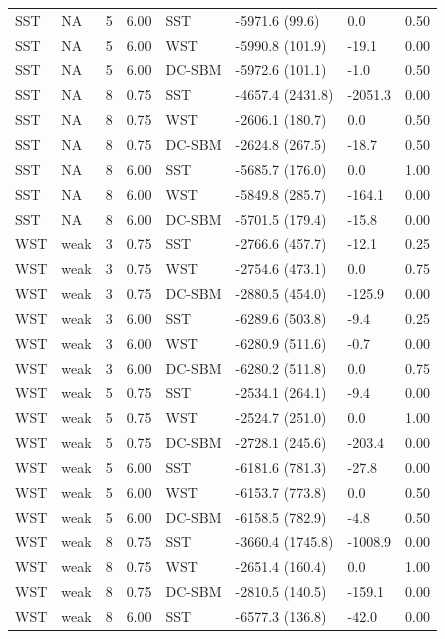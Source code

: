 \begin{table}
\begin{tabular}[t]{llrrllll}
\addlinespace
SST & NA & 5 & 6.00 & SST & -5971.6 (99.6) & 0.0 & 0.50\\
SST & NA & 5 & 6.00 & WST & -5990.8 (101.9) & -19.1 & 0.00\\
SST & NA & 5 & 6.00 & DC-SBM & -5972.6 (101.1) & -1.0 & 0.50\\
SST & NA & 8 & 0.75 & SST & -4657.4 (2431.8) & -2051.3 & 0.00\\
SST & NA & 8 & 0.75 & WST & -2606.1 (180.7) & 0.0 & 0.50\\
\addlinespace
SST & NA & 8 & 0.75 & DC-SBM & -2624.8 (267.5) & -18.7 & 0.50\\
SST & NA & 8 & 6.00 & SST & -5685.7 (176.0) & 0.0 & 1.00\\
SST & NA & 8 & 6.00 & WST & -5849.8 (285.7) & -164.1 & 0.00\\
SST & NA & 8 & 6.00 & DC-SBM & -5701.5 (179.4) & -15.8 & 0.00\\
WST & weak & 3 & 0.75 & SST & -2766.6 (457.7) & -12.1 & 0.25\\
\addlinespace
WST & weak & 3 & 0.75 & WST & -2754.6 (473.1) & 0.0 & 0.75\\
WST & weak & 3 & 0.75 & DC-SBM & -2880.5 (454.0) & -125.9 & 0.00\\
WST & weak & 3 & 6.00 & SST & -6289.6 (503.8) & -9.4 & 0.25\\
WST & weak & 3 & 6.00 & WST & -6280.9 (511.6) & -0.7 & 0.00\\
WST & weak & 3 & 6.00 & DC-SBM & -6280.2 (511.8) & 0.0 & 0.75\\
\addlinespace
WST & weak & 5 & 0.75 & SST & -2534.1 (264.1) & -9.4 & 0.00\\
WST & weak & 5 & 0.75 & WST & -2524.7 (251.0) & 0.0 & 1.00\\
WST & weak & 5 & 0.75 & DC-SBM & -2728.1 (245.6) & -203.4 & 0.00\\
WST & weak & 5 & 6.00 & SST & -6181.6 (781.3) & -27.8 & 0.00\\
WST & weak & 5 & 6.00 & WST & -6153.7 (773.8) & 0.0 & 0.50\\
\addlinespace
WST & weak & 5 & 6.00 & DC-SBM & -6158.5 (782.9) & -4.8 & 0.50\\
WST & weak & 8 & 0.75 & SST & -3660.4 (1745.8) & -1008.9 & 0.00\\
WST & weak & 8 & 0.75 & WST & -2651.4 (160.4) & 0.0 & 1.00\\
WST & weak & 8 & 0.75 & DC-SBM & -2810.5 (140.5) & -159.1 & 0.00\\
WST & weak & 8 & 6.00 & SST & -6577.3 (136.8) & -42.0 & 0.00\\

\end{tabular}
\end{table}
